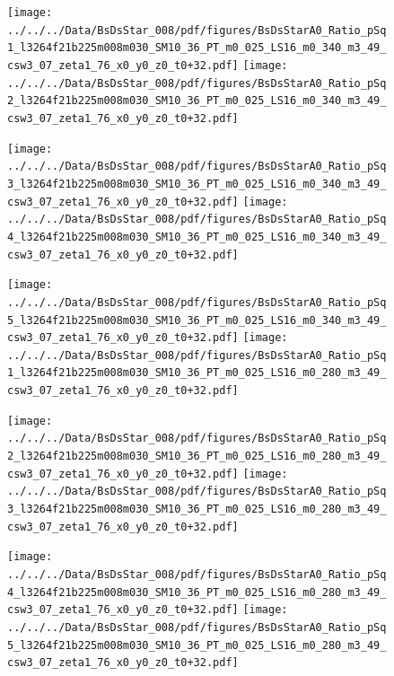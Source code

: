 \documentclass[a4paper,10pt]{article}
\begin{document}
\begin{figure}[p]
 \texttt{[image: ../../../Data/BsDsStar\_008/pdf/figures/BsDsStarA0\_Ratio\_pSq1\_l3264f21b225m008m030\_SM10\_36\_PT\_m0\_025\_LS16\_m0\_340\_m3\_49\_csw3\_07\_zeta1\_76\_x0\_y0\_z0\_t0+32.pdf]} 
 \texttt{[image: ../../../Data/BsDsStar\_008/pdf/figures/BsDsStarA0\_Ratio\_pSq2\_l3264f21b225m008m030\_SM10\_36\_PT\_m0\_025\_LS16\_m0\_340\_m3\_49\_csw3\_07\_zeta1\_76\_x0\_y0\_z0\_t0+32.pdf]} 
 \end{figure}
\begin{figure}[p]
 \texttt{[image: ../../../Data/BsDsStar\_008/pdf/figures/BsDsStarA0\_Ratio\_pSq3\_l3264f21b225m008m030\_SM10\_36\_PT\_m0\_025\_LS16\_m0\_340\_m3\_49\_csw3\_07\_zeta1\_76\_x0\_y0\_z0\_t0+32.pdf]} 
 \texttt{[image: ../../../Data/BsDsStar\_008/pdf/figures/BsDsStarA0\_Ratio\_pSq4\_l3264f21b225m008m030\_SM10\_36\_PT\_m0\_025\_LS16\_m0\_340\_m3\_49\_csw3\_07\_zeta1\_76\_x0\_y0\_z0\_t0+32.pdf]} 
 \end{figure}
\begin{figure}[p]
 \texttt{[image: ../../../Data/BsDsStar\_008/pdf/figures/BsDsStarA0\_Ratio\_pSq5\_l3264f21b225m008m030\_SM10\_36\_PT\_m0\_025\_LS16\_m0\_340\_m3\_49\_csw3\_07\_zeta1\_76\_x0\_y0\_z0\_t0+32.pdf]} 
 \texttt{[image: ../../../Data/BsDsStar\_008/pdf/figures/BsDsStarA0\_Ratio\_pSq1\_l3264f21b225m008m030\_SM10\_36\_PT\_m0\_025\_LS16\_m0\_280\_m3\_49\_csw3\_07\_zeta1\_76\_x0\_y0\_z0\_t0+32.pdf]} 
 \end{figure}
\clearpage
\begin{figure}[p]
 \texttt{[image: ../../../Data/BsDsStar\_008/pdf/figures/BsDsStarA0\_Ratio\_pSq2\_l3264f21b225m008m030\_SM10\_36\_PT\_m0\_025\_LS16\_m0\_280\_m3\_49\_csw3\_07\_zeta1\_76\_x0\_y0\_z0\_t0+32.pdf]} 
 \texttt{[image: ../../../Data/BsDsStar\_008/pdf/figures/BsDsStarA0\_Ratio\_pSq3\_l3264f21b225m008m030\_SM10\_36\_PT\_m0\_025\_LS16\_m0\_280\_m3\_49\_csw3\_07\_zeta1\_76\_x0\_y0\_z0\_t0+32.pdf]} 
 \end{figure}
\begin{figure}[p]
 \texttt{[image: ../../../Data/BsDsStar\_008/pdf/figures/BsDsStarA0\_Ratio\_pSq4\_l3264f21b225m008m030\_SM10\_36\_PT\_m0\_025\_LS16\_m0\_280\_m3\_49\_csw3\_07\_zeta1\_76\_x0\_y0\_z0\_t0+32.pdf]} 
 \texttt{[image: ../../../Data/BsDsStar\_008/pdf/figures/BsDsStarA0\_Ratio\_pSq5\_l3264f21b225m008m030\_SM10\_36\_PT\_m0\_025\_LS16\_m0\_280\_m3\_49\_csw3\_07\_zeta1\_76\_x0\_y0\_z0\_t0+32.pdf]} 
 \end{figure}
\clearpage
\end{document}

